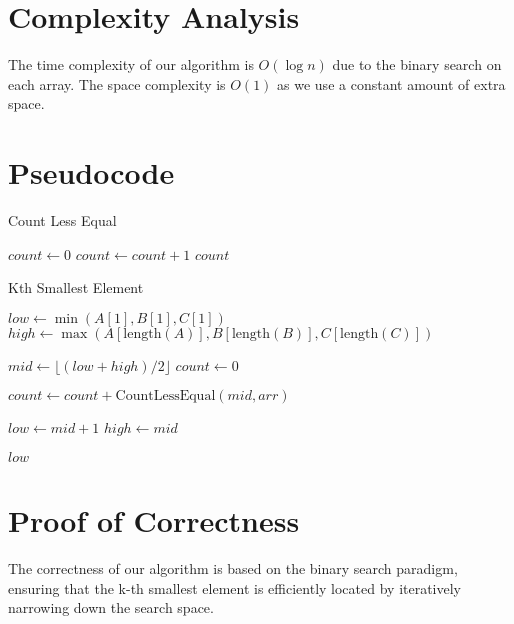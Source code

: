 \documentclass{article}
\begin{document}
 

\section{Complexity Analysis}
The time complexity of our algorithm is \(O(\log n)\) due to the binary search on each array. The space complexity is \(O(1)\) as we use a constant amount of extra space.


\section{Pseudocode}
\begin{algorithm}
\begin{algorithmic}[1]

\caption{Count Less Equal}

    \State $count \gets 0$
            \State $count \gets count + 1$
        \EndIf
    \EndFor
    \State \Return $count$
\EndFunction

\caption{Kth Smallest Element}
        \State $low \gets \min(A[1], B[1], C[1])$
        \State $high \gets \max(A[\text{length}(A)], B[\text{length}(B)], C[\text{length}(C)])$
        
            \State $mid \gets \lfloor (low + high) / 2 \rfloor$
            \State $count \gets 0$
            
                \State $count \gets count + \text{CountLessEqual}(mid, arr)$
            \EndFor
            
                \State $low \gets mid + 1$
            \Else
                \State $high \gets mid$
            \EndIf
        \EndWhile
        
        \State \Return $low$
    \EndFunction
\end{algorithmic}
\end{algorithm}



\section{Proof of Correctness}
The correctness of our algorithm is based on the binary search paradigm, ensuring that the k-th smallest element is efficiently located by iteratively narrowing down the search space.
\end{document}
